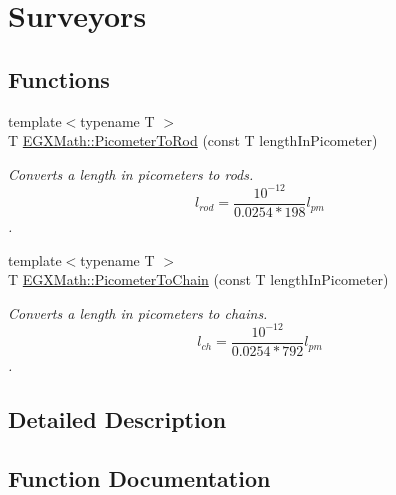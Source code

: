 \hypertarget{group___e_g_x_math-_conversions-_length_conversions-_picometer-_surveyors}{}\section{Surveyors}
\label{group___e_g_x_math-_conversions-_length_conversions-_picometer-_surveyors}
\subsection*{Functions}
\begin{DoxyCompactItemize}
\item 
{\footnotesize template$<$typename T $>$ }\\T \mbox{\hyperlink{group___e_g_x_math-_conversions-_length_conversions-_picometer-_surveyors_gad6009949eef7a49d34a7fa859ecdf0c6}{E\+G\+X\+Math\+::\+Picometer\+To\+Rod}} (const T length\+In\+Picometer)
\begin{DoxyCompactList}\small\item\em Converts a length in picometers to rods. \[ l_{rod}= \frac{10^{-12}}{0.0254 * 198} l_{pm} \]. \end{DoxyCompactList}\item 
{\footnotesize template$<$typename T $>$ }\\T \mbox{\hyperlink{group___e_g_x_math-_conversions-_length_conversions-_picometer-_surveyors_gae6629983b2f6ff484d0fc5c773193763}{E\+G\+X\+Math\+::\+Picometer\+To\+Chain}} (const T length\+In\+Picometer)
\begin{DoxyCompactList}\small\item\em Converts a length in picometers to chains. \[ l_{ch}= \frac{10^{-12}}{0.0254 * 792} l_{pm} \]. \end{DoxyCompactList}\end{DoxyCompactItemize}


\subsection{Detailed Description}


\subsection{Function Documentation}
\mbox{\label{group___e_g_x_math-_conversions-_length_conversions-_picometer-_surveyors_gae6629983b2f6ff484d0fc5c773193763}} 
